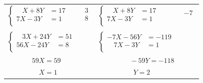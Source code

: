 \medskip 

\begin{tabular}{lp{3cm}ll}
\begin{minipage}{3cm}
$\begin{cases}
   \;\;\; X +8Y  \!\!\!\!\!\!\!\!&= 17\\
   7X -3Y \!\!\!\!\!\!\!\!&= 1\\
\end{cases}$ 
\end{minipage}  &  \multicolumn{1}{|l}{$\begin{array}{l}
                     3\\ 8 \\ 
                  \end{array}$ } & 
                   \begin{minipage}{3cm}
                   $\begin{cases}
                         \;\;\; X +8Y \!\!\!\!\!\!\!\!&= 17\\
                         7X -3Y  \!\!\!\!\!\!\!\!&= 1 \\
                   \end{cases} $ 
                \end{minipage} &  \multicolumn{1}{|l}{ $\begin{array}{l}
                                        -7\\~\\ 
                                  \end{array}$}\\
& & & \\
\begin{minipage}{3cm}
$\begin{cases}
   \;\;\; 3X +24Y \!\!\!\!\!\!\!\! &= 51\\
   56X -24Y \!\!\!\!\!\!\!\! &= 8\\
\end{cases}$ 
\end{minipage}  &  & 
                   \begin{minipage}{3cm}
                   $\begin{cases}
                         -7X -56Y \!\!\!\!\!\!\!\! &= -119\\
                          \quad 7X -3Y  \!\!\!\!\!\!\!\! &= 1 \\
                   \end{cases} $ 
                \end{minipage} &  \\
\cline{1-1} \cline{3-3}
\multicolumn{1}{l}{$\;\; \quad \qquad 59X=59$ } && \multicolumn{1}{r}{$\qquad \quad -59Y = -118$} & \\
$\;\;  \qquad \qquad X = 1$ && $\qquad \qquad \;\;\;\; Y = 2$ & \\
\end{tabular}\\
  
